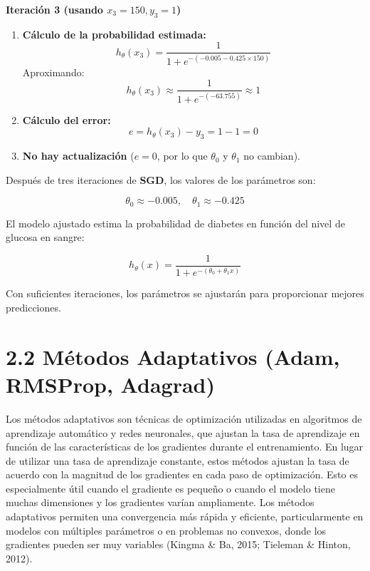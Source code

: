\documentclass{article}
\begin{document}
\textbf{Iteración 3 (usando \( x_3 = 150, y_3 = 1 \))}

\begin{enumerate}
	\item \textbf{Cálculo de la probabilidad estimada:}
	\[
	h_\theta(x_3) = \frac{1}{1 + e^{-(-0.005 - 0.425 \times 150)}}
	\]
	Aproximando:
	\[
	h_\theta(x_3) \approx \frac{1}{1 + e^{-(-63.755)}} \approx 1
	\]
	
	\item \textbf{Cálculo del error:}
	\[
	e = h_\theta(x_3) - y_3 = 1 - 1 = 0
	\]
	
	\item \textbf{No hay actualización} (\( e = 0 \), por lo que \( \theta_0 \) y \( \theta_1 \) no cambian).
\end{enumerate}



Después de tres iteraciones de \textbf{SGD}, los valores de los parámetros son:

\[
\theta_0 \approx -0.005, \quad \theta_1 \approx -0.425
\]

El modelo ajustado estima la probabilidad de diabetes en función del nivel de glucosa en sangre:

\[
h_\theta(x) = \frac{1}{1 + e^{-(\theta_0 + \theta_1 x)}}
\]

Con suficientes iteraciones, los parámetros se ajustarán para proporcionar mejores predicciones.


	
	\section*{2.2 Métodos Adaptativos (Adam, RMSProp, Adagrad)}
	
Los métodos adaptativos son técnicas de optimización utilizadas en algoritmos de aprendizaje automático y redes neuronales, que ajustan la tasa de aprendizaje en función de las características de los gradientes durante el entrenamiento. En lugar de utilizar una tasa de aprendizaje constante, estos métodos ajustan la tasa de acuerdo con la magnitud de los gradientes en cada paso de optimización. Esto es especialmente útil cuando el gradiente es pequeño o cuando el modelo tiene muchas dimensiones y los gradientes varían ampliamente. Los métodos adaptativos permiten una convergencia más rápida y eficiente, particularmente en modelos con múltiples parámetros o en problemas no convexos, donde los gradientes pueden ser muy variables (Kingma \& Ba, 2015; Tieleman \& Hinton, 2012).
\end{document}
